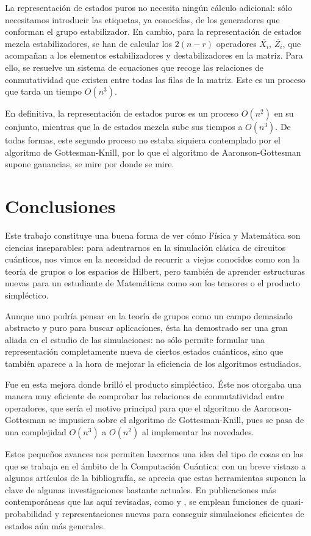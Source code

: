 \documentclass[11pt,a4paper,twoside,pdf]{article}
\numberwithin{equation}{section}
\begin{document}
	La representación de estados puros no necesita ningún cálculo adicional: sólo necesitamos introducir las etiquetas, ya conocidas, de los generadores que conforman el grupo estabilizador. En cambio, para la representación de estados mezcla estabilizadores, se han de calcular los $2(n-r)$  operadores $\overline{X_i}$, $\overline{Z_i}$, que acompañan a los elementos estabilizadores y destabilizadores en la matriz. Para ello, se resuelve un sistema de ecuaciones que recoge las relaciones de conmutatividad que existen entre todas las filas de la matriz. Este es un proceso que tarda un tiempo $O(n^3)$.
	
	En definitiva, la representación de estados puros es un proceso $O(n^2)$ en su conjunto, mientras que la de estados mezcla sube sus tiempos a $O(n^3)$. De todas formas, este segundo proceso no estaba siquiera contemplado por el algoritmo de Gottesman-Knill, por lo que el algoritmo de Aaronson-Gottesman supone ganancias, se mire por donde se mire.


\newpage
\section{Conclusiones}

Este trabajo constituye una buena forma de ver cómo Física y Matemática son ciencias inseparables: para adentrarnos en la simulación clásica de circuitos cuánticos, nos vimos en la necesidad de recurrir a viejos conocidos como son la teoría de grupos o los espacios de Hilbert, pero también de aprender estructuras nuevas para un estudiante de Matemáticas como son los tensores o el producto simpléctico. 

Aunque uno podría pensar en la teoría de grupos como un campo demasiado abstracto y puro para buscar aplicaciones, ésta ha demostrado ser una gran aliada en el estudio de las simulaciones: no sólo permite formular una representación completamente nueva de ciertos estados cuánticos, sino que también aparece a la hora de mejorar la eficiencia de los algoritmos estudiados.

Fue en esta mejora donde brilló el producto simpléctico. Éste nos otorgaba una manera muy eficiente de comprobar las relaciones de conmutatividad entre operadores, que sería el motivo principal para que el algoritmo de Aaronson-Gottesman \cite{Aaronson} se impusiera sobre el algoritmo de Gottesman-Knill\cite{NielsenChuang}, pues se pasa de una complejidad $O(n^3)$ a $O(n^2)$ al implementar las novedades.

Estos pequeños avances nos permiten hacernos una idea del tipo de cosas en las que se trabaja en el ámbito de la Computación Cuántica: con un breve vistazo a algunos artículos de la bibliografía, se aprecia que estas herramientas suponen la clave de algunas investigaciones bastante actuales. En publicaciones más contemporáneas que las aquí revisadas, como \cite{Vitch} y \cite{Raussendorf}, se emplean funciones de quasi-probabilidad y representaciones nuevas para conseguir simulaciones eficientes de estados aún más generales.
\end{document}
